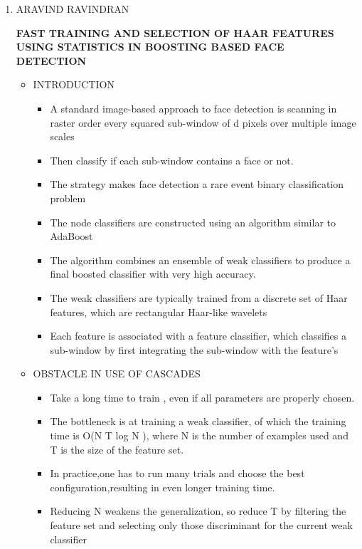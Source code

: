 \documentclass[10pt,a4paper,twoside]{report}
\begin{document}
\begin{appendix}
\begin{enumerate}
\begin{itemize}
\end{itemize}
\newpage
\item ARAVIND RAVINDRAN
\begin{center}
\textbf{FAST TRAINING AND SELECTION OF HAAR FEATURES USING STATISTICS IN BOOSTING BASED FACE DETECTION}
\end{center}
\begin{itemize}
\item INTRODUCTION
\begin{itemize}
\item A standard image-based approach to face detection is scanning in raster order every squared sub-window of d pixels over multiple image scales
\item Then classify if each sub-window contains a face or not.
\item The strategy makes face detection a rare event binary classification problem
\item The node classifiers are constructed using an algorithm similar to AdaBoost
\item The algorithm combines an ensemble of weak classifiers to produce a final boosted classifier with very high accuracy.
\item The weak classifiers are typically trained from a discrete set of Haar features, which are rectangular Haar-like wavelets
\item Each feature is associated with a feature classifier, which classifies a sub-window by first integrating the sub-window with the feature’s
\end{itemize}

\item	OBSTACLE IN USE OF CASCADES
\begin{itemize}
\item Take a long time to train , even if all parameters are properly chosen.
\item The bottleneck is at training a weak classifier, of which the training time is O(N T log N ), where N is the number of examples used and T is the size of the feature set.
\item In practice,one has to run many trials and choose the best configuration,resulting in even longer training time.
\item Reducing N weakens the generalization, so reduce T by filtering the feature set and selecting only those discriminant for the current weak classifier
\end{itemize}


\end{itemize}
\end{enumerate}
\end{appendix}
\end{document}
